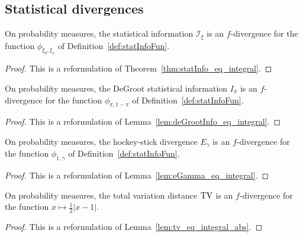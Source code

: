 \subsection{Statistical divergences}

\begin{lemma}
  \label{lem:statInfo_eq_fDiv}
  On probability measures, the statistical information $\mathcal I_\xi$ is an $f$-divergence for the function $\phi_{\xi_0, \xi_1}$ of Definition~\ref{def:statInfoFun}.
\end{lemma}

\begin{proof}%
{}
This is a reformulation of Theorem~\ref{thm:statInfo_eq_integral}.
\end{proof}

\begin{lemma}
  \label{lem:deGrootInfo_eq_fDiv}
  On probability measures, the DeGroot statistical information $I_\pi$ is an $f$-divergence for the function $\phi_{\pi, 1-\pi}$ of Definition~\ref{def:statInfoFun}.
\end{lemma}

\begin{proof}%
{}
This is a reformulation of Lemma~\ref{lem:deGrootInfo_eq_integral}.
\end{proof}

\begin{lemma}
  \label{lem:eGamma_eq_fDiv}
  On probability measures, the hockey-stick divergence $E_\gamma$ is an $f$-divergence for the function $\phi_{1,\gamma}$ of Definition~\ref{def:statInfoFun}.
\end{lemma}

\begin{proof}%
{}
This is a reformulation of Lemma~\ref{lem:eGamma_eq_integral}.
\end{proof}

\begin{lemma}
  \label{lem:tv_eq_fDiv}
  On probability measures, the total variation distance $\operatorname{TV}$ is an $f$-divergence for the function $x \mapsto \frac{1}{2}\vert x - 1 \vert$.
\end{lemma}

\begin{proof}%
{}
This is a reformulation of Lemma~\ref{lem:tv_eq_integral_abs}.
\end{proof}